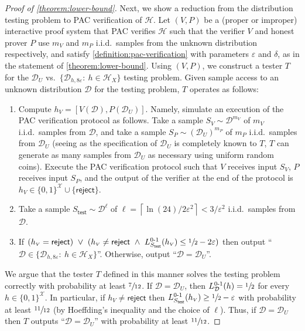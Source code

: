 \documentclass[11pt]{article}
\numberwithin{equation}{section}
\theoremstyle{definition}
\theoremstyle{plain}
\theoremstyle{definition}\newtheorem{notation}[theorem]{Notation}\theoremstyle{plain}\raggedbottom
\newcommand{\roundBrackets}[1]{
	\mathopen{}\left(#1\right)\mathclose{}
}
\newcommand{\LossIndicator}[2]{\LossIndicatorNameEmpty_{#1}\roundBrackets{#2}}
\newcommand{\LossIndicatorNameEmpty}{L^{0\text{-}1}}
\newcommand{\reject}{\mathsf{reject}}
\newcommand{\cD}{\mathcal{D}}
\newcommand{\cH}{\mathcal{H}}
\newcommand{\cX}{\mathcal{X}}
\newcommand{\1}{\mathds{1}}
\newcommand{\hV}{h_{\scriptscriptstyle V}}
\newcommand{\mP}{m_{\scriptscriptstyle P}}
\newcommand{\mV}{m_{\scriptscriptstyle V}}
\begin{document}
\begin{proof}[Proof of \cref{theorem:lower-bound}]
	Next, we show a reduction from the distribution testing problem to PAC verification of $\cH$. Let $(V,P)$ be a (proper or improper) interactive proof system that PAC verifies $\cH$ such that the verifier $V$ and honest prover $P$ use $\mV$ and $\mP$ i.i.d.\ samples from the unknown distribution respectively, and satisfy \cref{definition:pac-verification} with parameters $\varepsilon$ and $\delta$, as in the statement of \cref{theorem:lower-bound}.
	Using $(V,P)$, we construct a tester $T$ for the $\cD_U$ vs.\ $\{\cD_{h,8\varepsilon}: ~ h \in \cH_X\}$ testing problem. Given sample access to an unknown distribution $\cD$ for the testing problem, $T$ operates as follows:
	\begin{enumerate}
		\item{
			Compute $\hV = [V(\cD),P(\cD_U)]$. Namely, simulate an execution of the PAC verification protocol as follows. Take a sample $S_V \sim \cD^{\mV}$ of $\mV$ i.i.d.\ samples from $\cD$, and take a sample $S_P \sim (\cD_U)^{\mP}$ of $\mP$ i.i.d.\ samples from $\cD_U$ (seeing as the specification of $\cD_U$ is completely known to $T$, $T$ can generate as many samples from $\cD_U$ as necessary using uniform random coins). Execute the PAC verification protocol such that $V$ receives input $S_V$, $P$ receives input $S_P$, and the output of the verifier at the end of the protocol is $\hV \in \{0,1\}^\cX \cup \{\reject\}$.   
		}
		\item{
			Take a sample $S_{\mathsf{test}} \sim \cD^\ell$ of $\ell = \left\lceil \ln(24)/2\varepsilon^2 \right\rceil < 3/\varepsilon^2$ i.i.d.\ samples from $\cD$.
		}
		\item{
			If $(\hV = \reject)  ~ \lor ~ (\hV \neq \reject ~ \land ~ \LossIndicator{S_{\mathsf{test}}}{\hV} \leq \sfrac{1}{2}-2\varepsilon)$ then output ``$\cD \in \{\cD_{h,8\varepsilon} : ~ h \in \cH_X\}$''. Otherwise, output ``$\cD = \cD_U$''. 
		}
	\end{enumerate}
	We argue that the tester $T$ defined in this manner solves the testing problem correctly with probability at least $\sfrac{7}{12}$. If $\cD = \cD_U$, then $\LossIndicator{\cD}{h} = \sfrac{1}{2}$ for every $h \in \{0,1\}^\cX$. In particular, if $\hV \neq \reject$ then $\LossIndicator{S_{\mathsf{test}}}{\hV} \geq \sfrac{1}{2} - \varepsilon$ with probability at least $\sfrac{11}{12}$ (by Hoeffding's inequality and the choice of $\ell$). Thus, if $\cD = \cD_U$ then $T$ outputs ``$\cD = \cD_U$'' with probability at least $\sfrac{11}{12}$. 
	

\end{proof}
\end{document}
